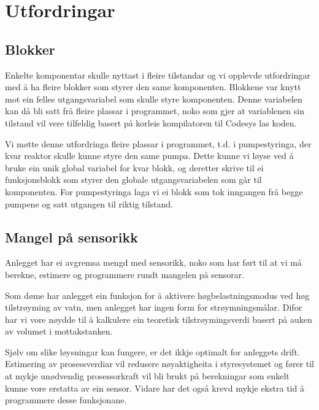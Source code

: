 \section{Utfordringar}
\thispagestyle{fancy}

\subsection{Blokker}
Enkelte komponentar skulle nyttast i fleire tilstandar og vi opplevde utfordringar med å ha fleire blokker som styrer den same komponenten.
Blokkene var knytt mot ein felles utgangsvariabel som skulle styre komponenten.
Denne variabelen kan då bli satt frå fleire plassar i programmet, noko som gjer at 
variablenen sin tilstand vil vere tilfeldig basert på korleis kompilatoren til \gls{Codesys} las koden.

Vi møtte denne utfordringa fleire plassar i programmet, t.d. i pumpestyringa,
der kvar reaktor skulle kunne styre den same pumpa.
Dette kunne vi løyse ved å bruke ein unik global variabel for kvar blokk, 
og deretter skrive til ei funksjonsblokk som styrer den globale utgangsvariabelen som går til komponenten.\newline
For pumpestyringa laga vi ei blokk som tok inngangen frå begge pumpene og satt utgangen til riktig tilstand.  

\subsection{Mangel på sensorikk}

Anlegget har ei avgremsa mengd med sensorikk, 
noko som har ført til at vi må berekne, estimere og programmere rundt mangelen på sensorar.

Som døme har anlegget ein funksjon for å aktivere
høgbelastningsmodus ved høg tilstrøyming av vatn, 
men anlegget har ingen form for strøymningsmålar.\newline
Difor har vi vore nøydde til å kalkulere ein teoretisk tilstrøymingsverdi basert på auken av volumet i mottakstanken.

Sjølv om slike løysningar kan fungere, er det ikkje optimalt for anleggets drift.
Estimering av prosessverdiar vil redusere nøyaktigheita i styresystemet og fører til at
mykje unødvendig prosessorkraft vil bli brukt på berekningar som enkelt kunne vore erstatta av ein sensor.\newline
Vidare har det også krevd mykje ekstra tid å programmere desse funksjonane.





